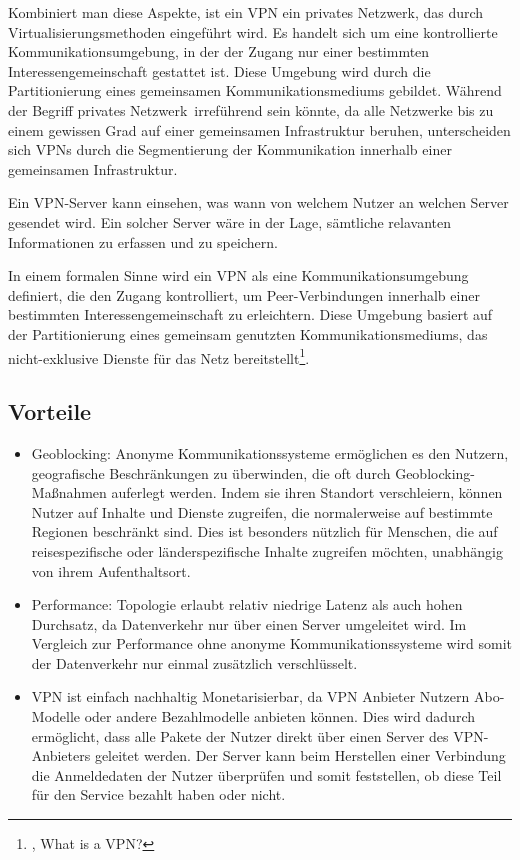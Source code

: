 Kombiniert man diese Aspekte, ist ein VPN ein privates Netzwerk, das durch Virtualisierungsmethoden eingeführt wird. Es handelt sich um eine kontrollierte Kommunikationsumgebung, in der der Zugang nur einer bestimmten Interessengemeinschaft gestattet ist. Diese Umgebung wird durch die Partitionierung eines gemeinsamen Kommunikationsmediums gebildet. Während der Begriff \glqq privates Netzwerk\grqq\ irreführend sein könnte, da alle Netzwerke bis zu einem gewissen Grad auf einer gemeinsamen Infrastruktur beruhen, unterscheiden sich VPNs durch die Segmentierung der Kommunikation innerhalb einer gemeinsamen Infrastruktur.

Ein VPN-Server kann einsehen, was wann von welchem Nutzer an welchen Server gesendet wird. Ein solcher Server wäre in der Lage, sämtliche relavanten Informationen zu erfassen und zu speichern.

In einem formalen Sinne wird ein VPN als eine Kommunikationsumgebung definiert, die den Zugang kontrolliert, um Peer-Verbindungen innerhalb einer bestimmten Interessengemeinschaft zu erleichtern. Diese Umgebung basiert auf der Partitionierung eines gemeinsam genutzten Kommunikationsmediums, das nicht-exklusive Dienste für das Netz bereitstellt\footnote{\cite{DefinitionOfVPN}, What is a VPN?}.

\subsection{Vorteile}

\begin{itemize}
    \item Geoblocking: Anonyme Kommunikationssysteme ermöglichen es den Nutzern, geografische Beschränkungen zu überwinden, die oft durch Geoblocking-Maßnahmen auferlegt werden. Indem sie ihren Standort verschleiern, können Nutzer auf Inhalte und Dienste zugreifen, die normalerweise auf bestimmte Regionen beschränkt sind. Dies ist besonders nützlich für Menschen, die auf reisespezifische oder länderspezifische Inhalte zugreifen möchten, unabhängig von ihrem Aufenthaltsort.
    \item Performance: Topologie erlaubt relativ niedrige Latenz als auch hohen Durchsatz, da Datenverkehr nur über einen Server umgeleitet wird. Im Vergleich zur Performance ohne anonyme Kommunikationssysteme wird somit der Datenverkehr nur einmal zusätzlich verschlüsselt.
    \item VPN ist einfach nachhaltig Monetarisierbar, da VPN Anbieter Nutzern Abo-Modelle oder andere Bezahlmodelle anbieten können. Dies wird dadurch ermöglicht, dass alle Pakete der Nutzer direkt über einen Server des VPN-Anbieters geleitet werden. Der Server kann beim Herstellen einer Verbindung die Anmeldedaten der Nutzer überprüfen und somit feststellen, ob diese Teil für den Service bezahlt haben oder nicht.
\end{itemize}

